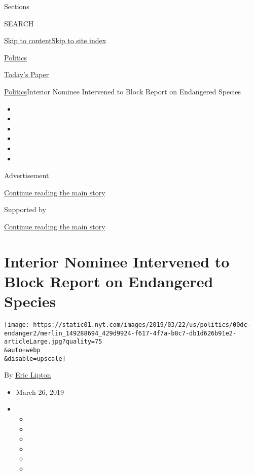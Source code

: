 Sections

SEARCH

\protect\hyperlink{site-content}{Skip to
content}\protect\hyperlink{site-index}{Skip to site index}

\href{https://www.nytimes.com/section/politics}{Politics}

\href{https://myaccount.nytimes.com/auth/login?response_type=cookie\&client_id=vi}{}

\href{https://www.nytimes.com/section/todayspaper}{Today's Paper}

\href{/section/politics}{Politics}\textbar{}Interior Nominee Intervened
to Block Report on Endangered Species

\begin{itemize}
\item
\item
\item
\item
\item
\item
\end{itemize}

Advertisement

\protect\hyperlink{after-top}{Continue reading the main story}

Supported by

\protect\hyperlink{after-sponsor}{Continue reading the main story}

\hypertarget{interior-nominee-intervened-to-block-report-on-endangered-species}{%
\section{Interior Nominee Intervened to Block Report on Endangered
Species}\label{interior-nominee-intervened-to-block-report-on-endangered-species}}

\texttt{[image: https://static01.nyt.com/images/2019/03/22/us/politics/00dc-endanger2/merlin\_149288694\_429d9924-f617-4f7a-b8c7-db1d626b91e2-articleLarge.jpg?quality=75\\\&auto=webp\\\&disable=upscale]}

By \href{https://www.nytimes.com/by/eric-lipton}{Eric Lipton}

\begin{itemize}
\item
  March 26, 2019
\item
  \begin{itemize}
  \item
  \item
  \item
  \item
  \item
  \item
  \end{itemize}
\end{itemize}

